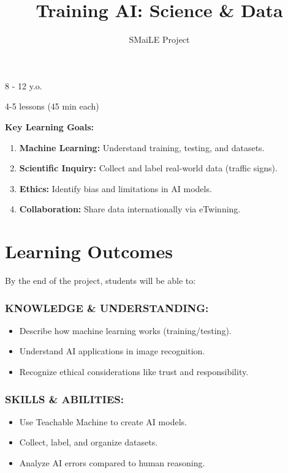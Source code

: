 \documentclass[11pt, a4paper]{article}
\begin{document}
\title{\textbf{\color{SmaileOrange}Training AI: Science \& Data}}
\author{SMaiLE Project}
\date{}
\maketitle
\thispagestyle{plain}

\begin{keyinfobox}
    \begin{description}[leftmargin=*, labelindent=0pt]
        \item[\bfseries\color{SmaileOrange} Target Group:] 8 - 12 y.o.
        \item[\bfseries\color{SmaileOrange} Duration:] 4-5 lessons (45 min each)
    \end{description}
    \textbf{Key Learning Goals:}
    \begin{enumerate}
        \item \textbf{Machine Learning:} Understand training, testing, and datasets.
        \item \textbf{Scientific Inquiry:} Collect and label real-world data (traffic signs).
        \item \textbf{Ethics:} Identify bias and limitations in AI models.
        \item \textbf{Collaboration:} Share data internationally via eTwinning.
    \end{enumerate}
\end{keyinfobox}

\section*{Learning Outcomes}
By the end of the project, students will be able to:

\subsubsection*{KNOWLEDGE \& UNDERSTANDING:}
\begin{itemize}
    \item Describe how machine learning works (training/testing).
    \item Understand AI applications in image recognition.
    \item Recognize ethical considerations like trust and responsibility.
\end{itemize}

\subsubsection*{SKILLS \& ABILITIES:}
\begin{itemize}
    \item Use Teachable Machine to create AI models.
    \item Collect, label, and organize datasets.
    \item Analyze AI errors compared to human reasoning.
\end{itemize}
\end{document}
